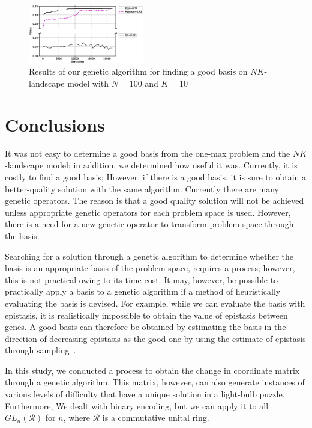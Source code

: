 \begin{figure}[H]
    \includegraphics[width=0.45\textwidth]{body_section/figures/GECCO_cob_nk.eps}
\caption{Results of our genetic algorithm for finding a good basis on $ NK $-landscape model with $ N = 100 $ and $ K = 10 $} \label{fig:results_nk_100_10}
\end{figure}


\section{Conclusions} \label{section:conclusions}
It was not easy to determine a good basis from the one-max problem and the $NK$-landscape model; in addition, we determined how useful it was.
Currently, it is costly to find a good basis; However, if there is a good basis, it is sure to obtain a better-quality solution with the same algorithm.
Currently there are many genetic operators.
The reason is that a good quality solution will not be achieved unless appropriate genetic operators for each problem space is used.
However, there is a need for a new genetic operator to transform problem space through the basis.

Searching for a solution through a genetic algorithm to determine whether the basis is an appropriate basis of the problem space, requires a process; however, this is not practical owing to its time cost.
It may, however, be possible to practically apply a basis to a genetic algorithm if a method of heuristically evaluating the basis is devised.
For example, while we can evaluate the basis with epistasis, it is realistically impossible to obtain the value of epistasis between genes.
A good basis can therefore be obtained by estimating the basis in the direction of decreasing epistasis as the good one by using the estimate of epistasis through sampling~\cite{yu2017epistasis}.

In this study, we conducted a process to obtain the change in coordinate matrix through a genetic algorithm.
This matrix, however, can also generate instances of various levels of difficulty that have a unique solution in a light-bulb puzzle.
Furthermore, We dealt with binary encoding, but we can apply it to all $ GL_n(\mathcal{R})$  for $n$, where $\mathcal{R}$ is a commutative unital ring.




